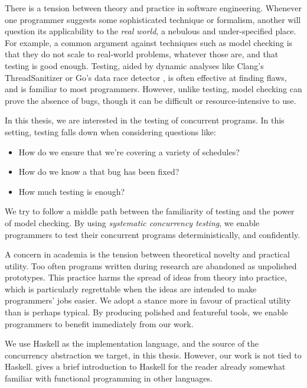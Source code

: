 There is a tension between theory and practice in software
engineering.  Whenever one programmer suggests some sophisticated
technique or formalism, another will question its applicability to the
\emph{real world}, a nebulous and under-specified place.  For example,
a common argument against techniques such as model checking is that
they do not scale to real-world problems, whatever those are, and that
testing is good enough.  Testing, aided by dynamic analyses like
Clang's ThreadSanitizer \parencite{serebryany2009} or Go's data race
detector \parencite{golang2017}, is often effective at finding flaws,
and is familiar to most programmers.  However, unlike testing, model
checking can prove the absence of bugs, though it can be difficult or
resource-intensive to use.

In this thesis, we are interested in the testing of concurrent
programs.  In this setting, testing falls down when considering
questions like:

\begin{itemize}
\item How do we ensure that we're covering a variety of schedules?
\item How do we know a that bug has been fixed?
\item How much testing is enough?
\end{itemize}

We try to follow a middle path between the familiarity of testing and
the power of model checking.  By using \emph{systematic concurrency
  testing}, we enable programmers to test their concurrent programs
deterministically, and confidently.

A concern in academia is the tension between theoretical novelty and
practical utility.  Too often programs written during research are
abandoned as unpolished prototypes.  This practice harms the spread of
ideas from theory into practice, which is particularly regrettable
when the ideas are intended to make programmers' jobs easier.  We
adopt a stance more in favour of practical utility than is perhaps
typical.  By producing polished and featureful tools, we enable
programmers to benefit immediately from our work.

We use Haskell as the implementation language, and the source of the
concurrency abstraction we target, in this thesis.  However, our work
is not tied to Haskell.   gives a brief introduction
to Haskell for the reader already somewhat familiar with functional
programming in other languages.

